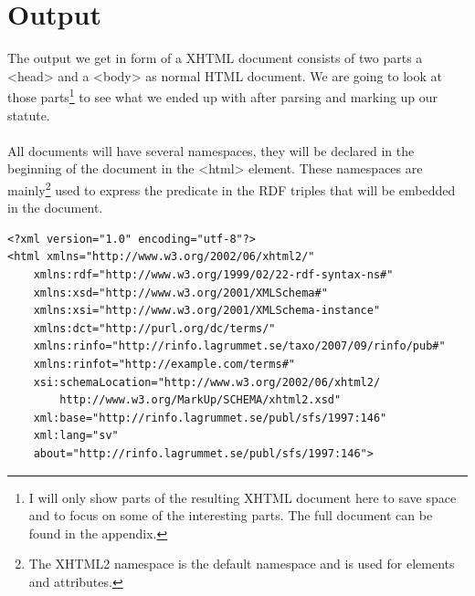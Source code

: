 \section{Output}
The output we get in form of a XHTML document consists of two parts a <head> and a <body> as normal HTML document. We are going to look at those parts\footnote{I will only show parts of the resulting XHTML document here to save space and to focus on some of the interesting parts. The full document can be found in the appendix.} to see what we ended up with after parsing and marking up our statute. \\\\
All documents will have several namespaces, they will be declared in the beginning of the document in the <html> element. These namespaces are mainly\footnote{The XHTML2 namespace is the default namespace and is used for elements and attributes.} used to express the predicate in the RDF triples that will be embedded in the document.\\ 
\begin{verbatim}
<?xml version="1.0" encoding="utf-8"?>
<html xmlns="http://www.w3.org/2002/06/xhtml2/" 
    xmlns:rdf="http://www.w3.org/1999/02/22-rdf-syntax-ns#" 
    xmlns:xsd="http://www.w3.org/2001/XMLSchema#" 
    xmlns:xsi="http://www.w3.org/2001/XMLSchema-instance" 
    xmlns:dct="http://purl.org/dc/terms/" 
    xmlns:rinfo="http://rinfo.lagrummet.se/taxo/2007/09/rinfo/pub#" 
    xmlns:rinfot="http://example.com/terms#" 
    xsi:schemaLocation="http://www.w3.org/2002/06/xhtml2/ 
    	http://www.w3.org/MarkUp/SCHEMA/xhtml2.xsd" 
    xml:base="http://rinfo.lagrummet.se/publ/sfs/1997:146" 
    xml:lang="sv" 
    about="http://rinfo.lagrummet.se/publ/sfs/1997:146">
\end{verbatim}
\linebreak
\newline

